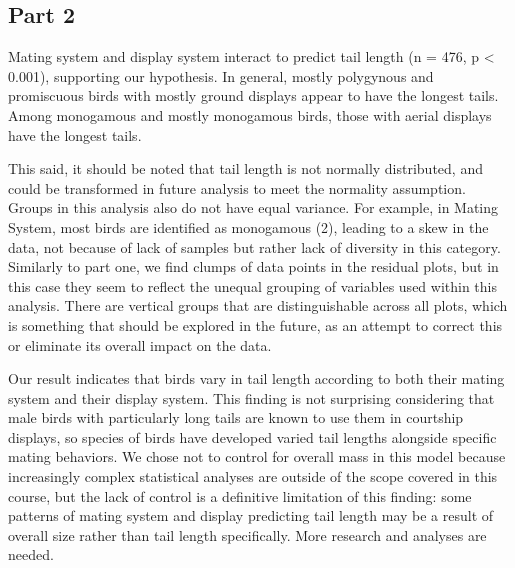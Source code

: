 \documentclass[
  12pt,
]{article}
\begin{document}
\newpage

\hypertarget{part-2}{%
\subsection{Part 2}\label{part-2}}

Mating system and display system interact to predict tail length (n =
476, p \textless{} 0.001), supporting our hypothesis. In general, mostly
polygynous and promiscuous birds with mostly ground displays appear to
have the longest tails. Among monogamous and mostly monogamous birds,
those with aerial displays have the longest tails.

This said, it should be noted that tail length is not normally
distributed, and could be transformed in future analysis to meet the
normality assumption. Groups in this analysis also do not have equal
variance. For example, in Mating System, most birds are identified as
monogamous (2), leading to a skew in the data, not because of lack of
samples but rather lack of diversity in this category. Similarly to part
one, we find clumps of data points in the residual plots, but in this
case they seem to reflect the unequal grouping of variables used within
this analysis. There are vertical groups that are distinguishable across
all plots, which is something that should be explored in the future, as
an attempt to correct this or eliminate its overall impact on the data.

Our result indicates that birds vary in tail length according to both
their mating system and their display system. This finding is not
surprising considering that male birds with particularly long tails are
known to use them in courtship displays, so species of birds have
developed varied tail lengths alongside specific mating behaviors. We
chose not to control for overall mass in this model because increasingly
complex statistical analyses are outside of the scope covered in this
course, but the lack of control is a definitive limitation of this
finding: some patterns of mating system and display predicting tail
length may be a result of overall size rather than tail length
specifically. More research and analyses are needed.
\end{document}
